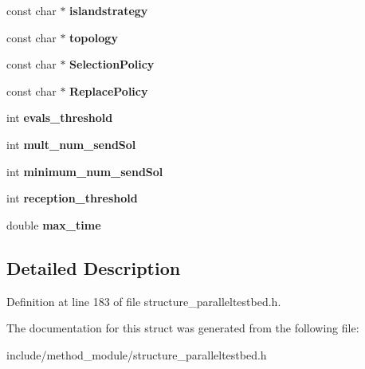 \begin{DoxyCompactItemize}
\item 
\hypertarget{structparallelization__strategy_a0a6213c6ab58b4977ac0dab7ce9d4422}{const char $\ast$ {\bfseries islandstrategy}}\label{structparallelization__strategy_a0a6213c6ab58b4977ac0dab7ce9d4422}

\item 
\hypertarget{structparallelization__strategy_ac2fb40c2d1a74c3476d0d9c942189e37}{const char $\ast$ {\bfseries topology}}\label{structparallelization__strategy_ac2fb40c2d1a74c3476d0d9c942189e37}

\item 
\hypertarget{structparallelization__strategy_a27f91284067e1c310fb4e38e28415d29}{const char $\ast$ {\bfseries Selection\-Policy}}\label{structparallelization__strategy_a27f91284067e1c310fb4e38e28415d29}

\item 
\hypertarget{structparallelization__strategy_ae3d6a1bf04682e227fab042e41f33713}{const char $\ast$ {\bfseries Replace\-Policy}}\label{structparallelization__strategy_ae3d6a1bf04682e227fab042e41f33713}

\item 
\hypertarget{structparallelization__strategy_a3d81fddea9f9d432ec7e7a9bbe92b51f}{int {\bfseries evals\-\_\-threshold}}\label{structparallelization__strategy_a3d81fddea9f9d432ec7e7a9bbe92b51f}

\item 
\hypertarget{structparallelization__strategy_a23f20f0417b94cfa9d9c101cf12e3ddf}{int {\bfseries mult\-\_\-num\-\_\-send\-Sol}}\label{structparallelization__strategy_a23f20f0417b94cfa9d9c101cf12e3ddf}

\item 
\hypertarget{structparallelization__strategy_a1586534c85a020e8e38ccbc2f2236e79}{int {\bfseries minimum\-\_\-num\-\_\-send\-Sol}}\label{structparallelization__strategy_a1586534c85a020e8e38ccbc2f2236e79}

\item 
\hypertarget{structparallelization__strategy_aa6c54cc9729b600d9ee40f3584c37dbf}{int {\bfseries reception\-\_\-threshold}}\label{structparallelization__strategy_aa6c54cc9729b600d9ee40f3584c37dbf}

\item 
\hypertarget{structparallelization__strategy_a3a599679511e948d52ee1171689af393}{double {\bfseries max\-\_\-time}}\label{structparallelization__strategy_a3a599679511e948d52ee1171689af393}

\end{DoxyCompactItemize}


\subsection{Detailed Description}


Definition at line 183 of file structure\-\_\-paralleltestbed.\-h.



The documentation for this struct was generated from the following file\-:\begin{DoxyCompactItemize}
\item 
include/method\-\_\-module/structure\-\_\-paralleltestbed.\-h\end{DoxyCompactItemize}

